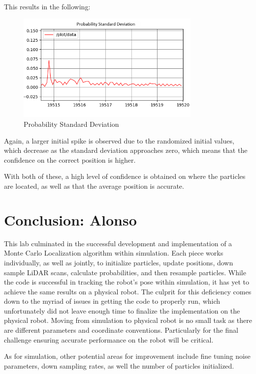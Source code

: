 \documentclass{article}
\begin{document}
This results in the following:
\begin{figure}[H]
    \centering
    \includegraphics[width=0.8\textwidth]{prob_std_dev.png}
    \caption{Probability Standard Deviation}
    \label{fig:prob-std-dev}
\end{figure}
Again, a larger initial spike is observed due to the randomized initial values, which decrease as the standard deviation approaches zero, which means that the confidence on the correct position is higher.

With both of these, a high level of confidence is obtained on where the particles are located, as well as that the average position is accurate. 


\section{Conclusion: Alonso}

This lab culminated in the successful development and implementation of a Monte Carlo Localization algorithm within simulation. Each piece works individually, as well as jointly, to initialize particles, update positions, down sample LiDAR scans, calculate probabilities, and then resample particles. While the code is successful in tracking the robot's pose within simulation, it has yet to achieve the same results on a physical robot. The culprit for this deficiency comes down to the myriad of issues in getting the code to properly run, which unfortunately did not leave enough time to finalize the implementation on the physical robot. Moving from simulation to physical robot is no small task as there are different parameters and coordinate conventions. Particularly for the final challenge ensuring accurate performance on the robot will be critical. 

As for simulation, other potential areas for improvement include fine tuning noise parameters, down sampling rates, as well the number of particles initialized.
\end{document}
